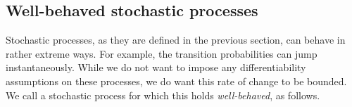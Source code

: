\documentclass[10pt,a4paper]{paper}
\theoremstyle{definition}
\newtheorem{proposition}[theorem]{Proposition}
\newcommand{\reals}{\mathbb{R}}
\newcommand{\realsnonneg}{\reals_{\geq 0}}
\newcommand{\states}{\mathcal{X}}
\newcommand{\paths}{\Omega}
\newcommand{\power}{\mathcal{P}(\paths)}
\newcommand{\nonemptypower}{\power_{\emptyset}}
\newcommand{\processes}{\mathbb{P}}
\newcommand{\coloneqq}{:\!=}
\begin{document}
%
%
%

\subsection{Well-behaved stochastic processes}\label{sec:well_behaved}

Stochastic processes, as they are defined in the previous section, can behave in rather extreme ways. For example, the transition probabilities can jump instantaneously. While we do not want to impose any differentiability assumptions on these processes, we do want this rate of change to be bounded. We call a stochastic process for which this holds \emph{well-behaved}, as follows.

\end{document}
